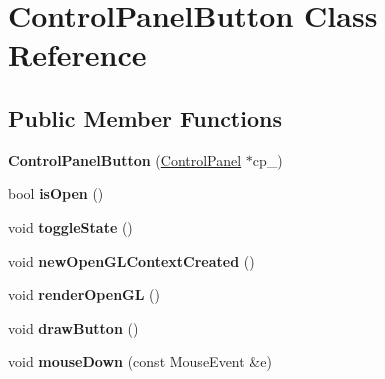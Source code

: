 \hypertarget{classControlPanelButton}{\section{Control\-Panel\-Button Class Reference}
\label{classControlPanelButton}
}
\subsection*{Public Member Functions}
\begin{DoxyCompactItemize}
\item 
\hypertarget{classControlPanelButton_aeeb4bd4128b5301ac902f5e1d3da1eea}{{\bfseries Control\-Panel\-Button} (\hyperlink{classControlPanel}{Control\-Panel} $\ast$cp\-\_\-)}\label{classControlPanelButton_aeeb4bd4128b5301ac902f5e1d3da1eea}

\item 
\hypertarget{classControlPanelButton_a49dd109b769582b9598a0f454fd39f06}{bool {\bfseries is\-Open} ()}\label{classControlPanelButton_a49dd109b769582b9598a0f454fd39f06}

\item 
\hypertarget{classControlPanelButton_a0158e881227f2382bdd3c71dada7f7f6}{void {\bfseries toggle\-State} ()}\label{classControlPanelButton_a0158e881227f2382bdd3c71dada7f7f6}

\item 
\hypertarget{classControlPanelButton_a84715321abda621693cec2bab8c283fe}{void {\bfseries new\-Open\-G\-L\-Context\-Created} ()}\label{classControlPanelButton_a84715321abda621693cec2bab8c283fe}

\item 
\hypertarget{classControlPanelButton_a9ea43519c7ca66fb9920625936564a9f}{void {\bfseries render\-Open\-G\-L} ()}\label{classControlPanelButton_a9ea43519c7ca66fb9920625936564a9f}

\item 
\hypertarget{classControlPanelButton_afdf353dfcec135b9150a3bda9e2da0e6}{void {\bfseries draw\-Button} ()}\label{classControlPanelButton_afdf353dfcec135b9150a3bda9e2da0e6}

\item 
\hypertarget{classControlPanelButton_a9b3041e05e6dcdb77020e78a3b0c2e26}{void {\bfseries mouse\-Down} (const Mouse\-Event \&e)}\label{classControlPanelButton_a9b3041e05e6dcdb77020e78a3b0c2e26}

\end{DoxyCompactItemize}
